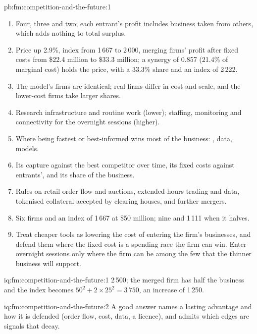\begin{solution}{pb:fm:competition-and-the-future:1}
\begin{enumerate}
\item Four, three and two; each entrant's profit includes business taken from others, which adds nothing to total surplus.
\item Price up 2.9\%, index from 1\,667 to 2\,000, merging firms' profit after fixed costs from \$22.4 million to \$33.3 million; a synergy of 0.857
(21.4\% of marginal cost) holds the price, with a 33.3\% share and an index of 2\,222.
\item The model's firms are identical; real firms differ in cost and scale, and the lower-cost firms take larger shares.
\item Research infrastructure and routine work (lower); staffing, monitoring and connectivity for the overnight sessions (higher).
\item Where being fastest or best-informed wins most of the business: , data, models.
\item Its capture against the best competitor over time, its fixed costs against entrants', and its share of the business.
\item Rules on retail order flow and auctions, extended-hours trading and data, tokenised collateral accepted by clearing houses, and further mergers.
\item Six firms and an index of 1\,667 at \$50 million; nine and 1\,111 when it halves.
\item Treat cheaper tools as lowering the cost of entering the firm's businesses, and defend them where the fixed cost is a spending race the firm can
win. Enter overnight sessions only where the firm can be among the few that the thinner business will support.
\end{enumerate}
\end{solution}

\begin{solution}{iq:fm:competition-and-the-future:1}
2\,500; the merged firm has half the business and the index becomes $50^2+2\times25^2=3\,750$, an increase of 1\,250.
\end{solution}

\begin{solution}{iq:fm:competition-and-the-future:2}
A good answer names a lasting advantage and how it is defended (order flow, cost, data, a licence), and admits which edges are signals that
decay.
\end{solution}

